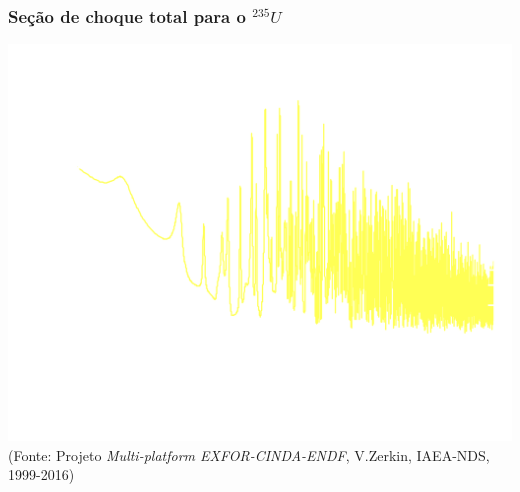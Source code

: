 \documentclass[svgnames,smaller,table]{beamer}
\begin{document}
{

  \begin{frame}
  \frametitle{Seção de choque total para o $^{235}U$}
  \centering\includegraphics[scale=0.15]{../figuras/cu-neg.png}
  \\
  \centering
  \scriptsize{(Fonte: Projeto \textit{Multi-platform EXFOR-CINDA-ENDF}, V.Zerkin, IAEA-NDS, 1999-2016)}
\end{frame}
}
\end{document}
